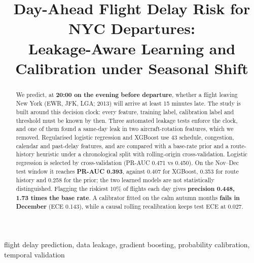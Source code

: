 \documentclass[conference]{IEEEtran}
\begin{document}
\title{Day-Ahead Flight Delay Risk for NYC Departures:\\
Leakage-Aware Learning and Calibration under Seasonal Shift}

\author{
}

\maketitle

\begin{abstract}
We predict, at \textbf{20:00 on the evening before departure}, whether a flight leaving New York (EWR, JFK, LGA; 2013) will arrive at least 15 minutes late. The study is built around this decision clock: every feature, training label, calibration label and threshold must be known by then. Three automated leakage tests enforce the clock, and one of them found a same-day leak in two aircraft-rotation features, which we removed. Regularised logistic regression and XGBoost use 43 schedule, congestion, calendar and past-delay features, and are compared with a base-rate prior and a route-history heuristic under a chronological split with rolling-origin cross-validation. Logistic regression is selected by cross-validation (PR-AUC 0.471 vs 0.450). On the Nov--Dec test window it reaches \textbf{PR-AUC 0.393}, against 0.407 for XGBoost, 0.353 for route history and 0.258 for the prior; the two learned models are not statistically distinguished. Flagging the riskiest 10\% of flights each day gives \textbf{precision 0.448, 1.73 times the base rate}. A calibrator fitted on the calm autumn months \textbf{fails in December} (ECE 0.143), while a causal rolling recalibration keeps test ECE at 0.027.
\end{abstract}

\begin{IEEEkeywords}
flight delay prediction, data leakage, gradient boosting, probability calibration, temporal validation
\end{IEEEkeywords}

\end{document}
